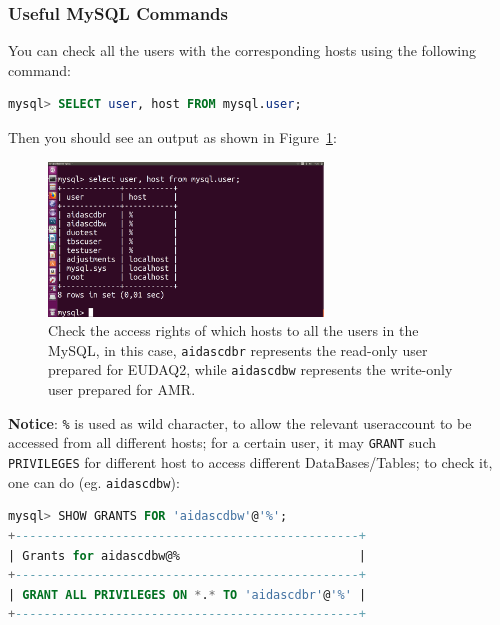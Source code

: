 \documentclass[a4paper,12pt]{scrartcl}
\begin{document}
\subsubsection*{Useful MySQL Commands}

You can check all the users with the corresponding hosts using the following command:
\begin{lstlisting}[language=SQL]
mysql> SELECT user, host FROM mysql.user;
\end{lstlisting}

Then you should see an output as shown in Figure~\ref{fig:mysql-user}:
\begin{figure}[!ht] \centering
\includegraphics[trim={2cm 7cm 0cm 3cm},clip,width=0.65\textwidth]{figs/mysqluser.png}
\caption{Check the access rights of which hosts to all the users in the MySQL, in this case, \texttt{aidascdbr} represents the read-only user prepared for EUDAQ2, while \texttt{aidascdbw} represents the write-only user prepared for AMR.}
\label{fig:mysql-user}
\end{figure}

\textbf{Notice}: \texttt{\%} is used as wild character, to allow the relevant useraccount to be accessed from all different hosts; for a certain user, it may \texttt{GRANT} such \texttt{PRIVILEGES} for different host to access different DataBases/Tables; to check it, one can do (eg. \texttt{aidascdbw}):
\begin{lstlisting}[language=SQL]
mysql> SHOW GRANTS FOR 'aidascdbw'@'%';
+------------------------------------------------+
| Grants for aidascdbw@%                         |
+------------------------------------------------+
| GRANT ALL PRIVILEGES ON *.* TO 'aidascdbr'@'%' |
+------------------------------------------------+
\end{lstlisting}
\end{document}
